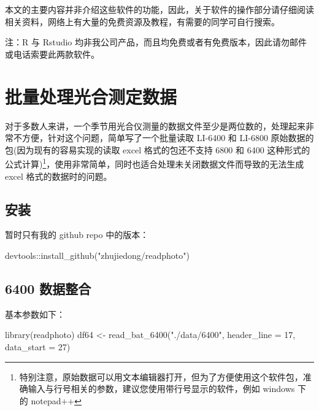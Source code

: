\documentclass[
]{krantz}
\makeatletter
\newenvironment{Shaded}{\begin{snugshade}}{\end{snugshade}}
\newcommand{\AttributeTok}[1]{\textcolor[rgb]{0.77,0.63,0.00}{#1}}
\newcommand{\DecValTok}[1]{\textcolor[rgb]{0.00,0.00,0.81}{#1}}
\newcommand{\FunctionTok}[1]{\textcolor[rgb]{0.00,0.00,0.00}{#1}}
\newcommand{\NormalTok}[1]{#1}
\newcommand{\OtherTok}[1]{\textcolor[rgb]{0.56,0.35,0.01}{#1}}
\newcommand{\SpecialCharTok}[1]{\textcolor[rgb]{0.00,0.00,0.00}{#1}}
\newcommand{\StringTok}[1]{\textcolor[rgb]{0.31,0.60,0.02}{#1}}
\renewenvironment{quote}{\begin{VF}}{\end{VF}}
\newenvironment{kframe}{%
\medskip{}
\setlength{\fboxsep}{.8em}
 \def\at@end@of@kframe{}%
 \ifinner\ifhmode%
  \def\at@end@of@kframe{\end{minipage}}%
  \begin{minipage}{\columnwidth}%
 \fi\fi%
 \def\FrameCommand##1{\hskip\@totalleftmargin \hskip-\fboxsep
 \colorbox{shadecolor}{##1}\hskip-\fboxsep
     \hskip-\linewidth \hskip-\@totalleftmargin \hskip\columnwidth}%
 \MakeFramed {\advance\hsize-\width
   \@totalleftmargin\z@ \linewidth\hsize
   \@setminipage}}%
 {\par\unskip\endMakeFramed%
 \at@end@of@kframe}
\renewenvironment{Shaded}{\begin{kframe}}{\end{kframe}}
\makeatother
\begin{document}
本文的主要内容并非介绍这些软件的功能，因此，关于软件的操作部分请仔细阅读相关资料，网络上有大量的免费资源及教程，有需要的同学可自行搜索。

\begin{quote}
注：R 与 Rstudio 均非我公司产品，而且均免费或者有免费版本，因此请勿邮件或电话索要此两款软件。
\end{quote}

\cleardoublepage

\hypertarget{batch_question}{%
\chapter{批量处理光合测定数据}\label{batch_question}}

对于多数人来讲，一个季节用光合仪测量的数据文件至少是两位数的，处理起来非常不方便，针对这个问题，简单写了一个批量读取 LI-6400 和 LI-6800 原始数据的包(因为现有的容易实现的读取 excel 格式的包还不支持 6800 和 6400 这种形式的公式计算)\footnote{特别注意，原始数据可以用文本编辑器打开，但为了方便使用这个软件包，准确输入与行号相关的参数，建议您使用带行号显示的软件，例如 windows 下的 notepad++}，使用非常简单，同时也适合处理未关闭数据文件而导致的无法生成 excel 格式的数据时的问题。

\hypertarget{install_readphoto}{%
\section{安装}\label{install_readphoto}}

暂时只有我的 github repo 中的版本：

\begin{Shaded}
\begin{Highlighting}[]
\NormalTok{devtools}\SpecialCharTok{::}\FunctionTok{install\_github}\NormalTok{(}\StringTok{"zhujiedong/readphoto"}\NormalTok{)}
\end{Highlighting}
\end{Shaded}

\hypertarget{batch64}{%
\section{6400 数据整合}\label{batch64}}

基本参数如下：

\begin{Shaded}
\begin{Highlighting}[]
\FunctionTok{library}\NormalTok{(readphoto)}
\NormalTok{df64  }\OtherTok{\textless{}{-}} \FunctionTok{read\_bat\_6400}\NormalTok{(}\StringTok{"./data/6400"}\NormalTok{, }\AttributeTok{header\_line =} \DecValTok{17}\NormalTok{, }\AttributeTok{data\_start =} \DecValTok{27}\NormalTok{)}
\end{Highlighting}
\end{Shaded}
\end{document}
